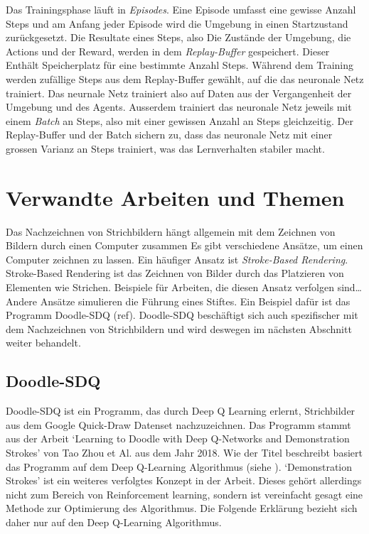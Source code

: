 Das Trainingsphase läuft in \emph{Episodes}. Eine Episode umfasst eine gewisse
Anzahl Steps und am Anfang jeder Episode wird die Umgebung in einen Startzustand
zurückgesetzt. Die Resultate eines Steps, also Die Zustände der Umgebung, die
Actions und der Reward, werden in dem \emph{Replay-Buffer} gespeichert. Dieser
Enthält Speicherplatz für eine bestimmte Anzahl Steps. Während dem Training
werden zufällige Steps aus dem Replay-Buffer gewählt, auf die das neuronale Netz
trainiert. Das neurnale Netz trainiert also auf Daten aus der Vergangenheit
der Umgebung und des Agents. Ausserdem trainiert das neuronale Netz jeweils mit
einem \emph{Batch} an Steps, also mit einer gewissen Anzahl an Steps
gleichzeitig. Der Replay-Buffer und der Batch sichern zu, dass das neuronale
Netz mit einer grossen Varianz an Steps trainiert, was das Lernverhalten
stabiler macht.



\section{Verwandte Arbeiten und Themen}
\label{chap:t_verwandt}
Das Nachzeichnen von Strichbildern hängt allgemein mit dem Zeichnen von Bildern
durch einen Computer zusammen Es gibt verschiedene Ansätze, um einen Computer
zeichnen zu lassen. Ein häufiger Ansatz ist \emph{Stroke-Based Rendering}.
Stroke-Based Rendering ist das Zeichnen von Bilder durch das Platzieren von
Elementen wie Strichen. Beispiele für Arbeiten, die diesen Ansatz verfolgen
sind\dots     %
Andere Ansätze simulieren die Führung eines Stiftes. Ein Beispiel dafür ist das
Programm Doodle-SDQ (ref). Doodle-SDQ beschäftigt sich auch spezifischer mit dem
Nachzeichnen von Strichbildern und wird deswegen im nächsten Abschnitt weiter
behandelt. %

\subsection*{Doodle-SDQ}
Doodle-SDQ ist ein Programm, das durch Deep Q Learning erlernt, Strichbilder
aus dem Google Quick-Draw Datenset nachzuzeichnen. Das Programm stammt aus der    %
Arbeit `Learning to Doodle with Deep Q-Networks and Demonstration Strokes' von
Tao Zhou et Al. aus dem Jahr 2018. Wie der Titel beschreibt basiert das Programm
auf dem Deep Q-Learning Algorithmus (siehe ). `Demonstration
Strokes' ist ein weiteres verfolgtes Konzept in der Arbeit. Dieses gehört
allerdings nicht zum Bereich von Reinforcement learning, sondern ist vereinfacht
gesagt eine Methode zur Optimierung des Algorithmus. Die Folgende Erklärung
bezieht sich daher nur auf den Deep Q-Learning Algorithmus.

